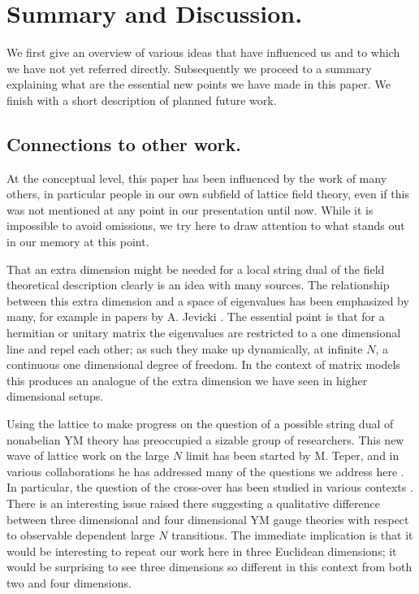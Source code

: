 \section{Summary and Discussion.}

We first give an overview of various ideas that have influenced us
and to which we have not yet referred directly. Subsequently we
proceed to a summary explaining what are the essential new points
we have made in this paper. We finish with a short description of
planned future work.

\subsection{Connections to other work.}

At the conceptual level, this paper has been influenced by the
work of many others, in particular people in our own subfield of
lattice field theory, even if this was not mentioned at any point
in our presentation until now. While it is impossible to avoid
omissions, we try here to draw attention to what stands out in our
memory at this point.

That an extra dimension might be needed for a local string dual of
the field theoretical description clearly is an idea with many
sources. The relationship between this extra dimension and a space
of eigenvalues has been emphasized by many, for example in papers
by A. Jevicki \cite{jevi}. The essential point is that for a
hermitian or unitary matrix the eigenvalues are restricted to a
one dimensional line and repel each other; as such they make up
dynamically, at infinite $N$, a continuous one dimensional degree
of freedom. In the context of matrix models this produces an
analogue of the extra dimension we have seen in higher dimensional
setups.

Using the lattice to make progress on the question of a possible
string dual of nonabelian YM theory has preoccupied a sizable
group of researchers. This new wave of lattice work on the large $N$
limit has been started by M. Teper, and in various collaborations
he has addressed many of the questions we address
here \cite{teper}. In particular, the question of the cross-over
has been studied in various contexts \cite{teper-cross-over}. There
is an interesting issue raised there suggesting a qualitative
difference between three dimensional and four dimensional YM gauge
theories with respect to observable dependent large $N$
transitions. The immediate implication is that it would be
interesting to repeat our work here in three Euclidean dimensions;
it would be surprising to see three dimensions so different in
this context from both two and four dimensions.

